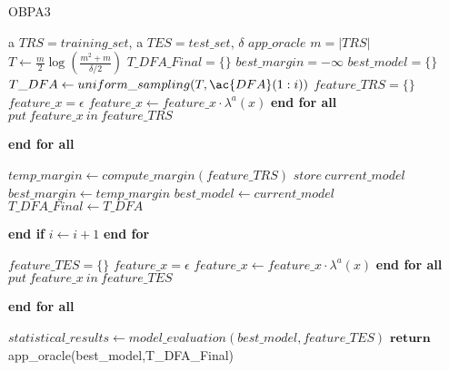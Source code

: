 \begin{algorithm}
\caption{OBPA3}\label{alg:obpa3}
\begin{algorithmic}[1]
\Statex
\Input a $TRS = training\_set$, a $TES = test\_set$, $\delta$   
\Output $app\_oracle $
\State $m = |TRS|$ 
\State $T \gets \frac{m}{2}\log(\frac{m^{2}+m}{\delta/2})$ 
\State $T\_DFA\_Final = \{\}$ 
\State $best\_margin = -\infty$
\State $best\_model = \{\}$ 
   \State $T\_DFA \gets uniform\_sampling(T , \ac{DFA}(1:i))$ 
   \State $feature\_TRS = \{\}$ 
   \Statex
     \State $feature\_x =\epsilon $ 
          \State $feature\_x \gets feature\_x \cdot \lambda^{a}(x)$
      \EndFor
      \State \textbf{end for all}
      \State $put \: feature\_x \: in \: feature\_TRS$
      
   \EndFor
   \State \textbf{end for all}
\Statex

\State $temp\_margin \gets compute\_margin(feature\_TRS)$ 
\State $store \: current\_model$ 
\State $best\_margin \gets temp\_margin$
\State $best\_model \gets current\_model$
\State $T\_DFA\_Final \gets T\_DFA$

\EndIf
\State \textbf{end if}
\State $i \gets i+1$
\EndFor
\State \textbf{end for}


 \State $feature\_TES = \{\}$ 
     \State $feature\_x =\epsilon $ 
          \State $feature\_x \gets feature\_x \cdot \lambda^{a}(x)$
      \EndFor
      \State \textbf{end for all}
      \State $put \: feature\_x \: in \: feature\_TES$
      
   \EndFor
   \State \textbf{end for all}

\State $statistical\_results \gets model\_evaluation(best\_model,feature\_TES)$ 
\State $\textbf{return}$ app\_oracle(best\_model,T\_DFA\_Final) 

   
\end{algorithmic}
\end{algorithm}


